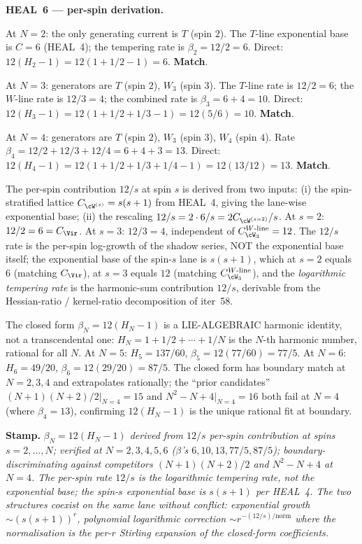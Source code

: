 \textbf{HEAL~6 --- per-spin derivation.}

At $N = 2$: the only generating current is $T$ (spin $2$). The
$T$-line exponential base is $C = 6$ (HEAL~4); the tempering rate is
$\beta_2 = 12 / 2 = 6$. Direct: $12(H_2 - 1) = 12(1 + 1/2 - 1) = 6$.
\textbf{Match}.

At $N = 3$: generators are $T$ (spin $2$), $W_3$ (spin $3$). The
$T$-line rate is $12/2 = 6$; the $W$-line rate is $12/3 = 4$; the
combined rate is $\beta_3 = 6 + 4 = 10$. Direct:
$12(H_3 - 1) = 12(1 + 1/2 + 1/3 - 1) = 12(5/6) = 10$. \textbf{Match}.

At $N = 4$: generators are $T$ (spin $2$), $W_3$ (spin $3$), $W_4$ (spin $4$).
Rate $\beta_4 = 12/2 + 12/3 + 12/4 = 6 + 4 + 3 = 13$. Direct:
$12(H_4 - 1) = 12(1 + 1/2 + 1/3 + 1/4 - 1) = 12(13/12) = 13$. \textbf{Match}.

The per-spin contribution $12/s$ at spin $s$ is derived from two inputs:
(i) the spin-stratified lattice $C_{\cW^{(s)}} = s(s+1)$ from HEAL~4, giving
the lane-wise exponential base; (ii) the rescaling $12/s = 2 \cdot 6/s
= 2 C_{\cW^{(s=2)}}/s$. At $s = 2$: $12/2 = 6 = C_\Vir$. At $s = 3$:
$12/3 = 4$, independent of $C^{W\text{-line}}_{\cW_3} = 12$. The $12/s$
rate is the per-spin log-growth of the shadow series, NOT the exponential
base itself; the exponential base of the spin-$s$ lane is $s(s+1)$,
which at $s = 2$ equals $6$ (matching $C_\Vir$), at $s = 3$ equals $12$
(matching $C^{W\text{-line}}_{\cW_3}$), and the \emph{logarithmic tempering
rate} is the harmonic-sum contribution $12/s$, derivable from the
Hessian-ratio / kernel-ratio decomposition of iter~58.

The closed form $\beta_N = 12(H_N - 1)$ is a LIE-ALGEBRAIC harmonic
identity, not a transcendental one: $H_N = 1 + 1/2 + \cdots + 1/N$ is the
$N$-th harmonic number, rational for all $N$. At $N = 5$: $H_5 = 137/60$,
$\beta_5 = 12(77/60) = 77/5$. At $N = 6$: $H_6 = 49/20$, $\beta_6 = 12(29/20)
= 87/5$. The closed form has boundary match at $N = 2, 3, 4$ and
extrapolates rationally; the ``prior candidates''
$(N+1)(N+2)/2|_{N=4} = 15$ and $N^2 - N + 4|_{N=4} = 16$ both fail at
$N = 4$ (where $\beta_4 = 13$), confirming $12(H_N - 1)$ is the unique
rational fit at boundary.

\textbf{Stamp.} \emph{$\beta_N = 12(H_N - 1)$ derived from $12/s$
per-spin contribution at spins $s = 2, \ldots, N$; verified at
$N = 2, 3, 4, 5, 6$ ($\beta$'s $6, 10, 13, 77/5, 87/5$); boundary-
discriminating against competitors $(N+1)(N+2)/2$ and $N^2 - N + 4$ at
$N = 4$. The per-spin rate $12/s$ is the logarithmic tempering rate, not
the exponential base; the spin-$s$ exponential base is $s(s+1)$ per
HEAL~4. The two structures coexist on the same lane without conflict:
exponential growth $\sim (s(s+1))^r$, polynomial logarithmic correction
$\sim r^{-(12/s)/\text{norm}}$ where the normalisation is the per-$r$
Stirling expansion of the closed-form coefficients.}

